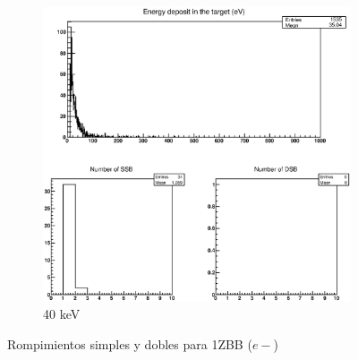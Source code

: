 \begin{figure}
\begin{subfigure}{.5\textwidth}
  \includegraphics[width=.78\linewidth]{./Figures/e40kev.eps}
  \caption{40 keV}
  \label{fig:subei8}
\end{subfigure}
\caption{Rompimientos simples y dobles para 1ZBB ($e-$)}
\label{fig:e}
\end{figure}

